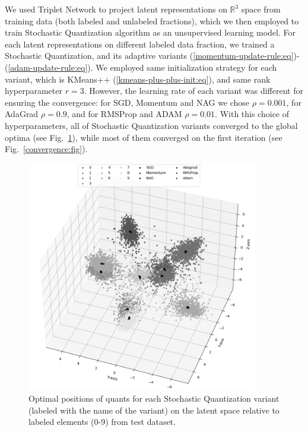 We used Triplet Network to project latent representations on $\mathbb{R}^3$ space from training data (both labeled and unlabeled fractions), which we then employed to train Stochastic Quantization algorithm as an unsupervised learning model. For each latent representations on different labeled data fraction, we trained a Stochastic Quantization, and its adaptive variants (\ref{momentum-update-rule:eq})-(\ref{adam-update-rule:eq}). We employed same initialization strategy for each variant, which is KMeans++ (\ref{kmeans-plus-plus-init:eq}), and same rank hyperparameter $ r = 3 $. However, the learning rate of each variant was different for ensuring the convergence: for SGD, Momentum and NAG we chose $ \rho = 0.001 $, for AdaGrad $ \rho = 0.9 $, and for RMSProp and ADAM $ \rho = 0.01 $. With this choice of hyperparameters, all of Stochastic Quantization variants converged to the global optima (see Fig.~\ref{quants:fig}), while most of them converged on the first iteration (see Fig.~\ref{convergence:fig}).

\begin{figure}
    \centering
    \includegraphics[width=0.9\textwidth]{figures/sq_quants.png}
    \caption{Optimal positions of quants for each Stochastic Quantization variant (labeled with the name of the variant) on the latent space relative to labeled elements (0-9) from test dataset.} \label{quants:fig}
\end{figure}

